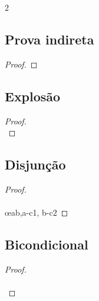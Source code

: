 \begin{multicols}{2}
\subsection*{Prova indireta}

\begin{proof}
\open
\close
{}
\end{proof}


\subsection*{Explosão}

\begin{proof}
\\
\end{proof}

\subsection*{Disjunção}

\begin{proof}
\\	
\\	\open
	\close
	\open
	\close
	 \oe{ab,a-c1, b-c2}
\end{proof}

\subsection*{Bicondicional}

\begin{proof}
	\open
	\close
	\open
	\close
\\	
	 
\\	
	 
\end{proof}

\end{multicols}

